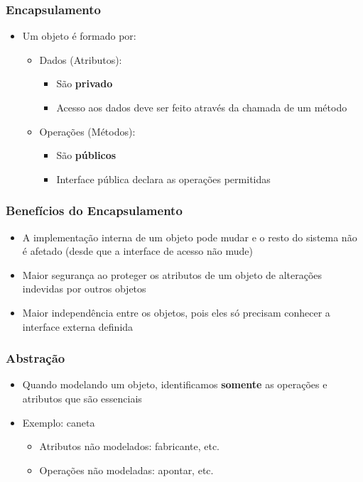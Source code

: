 \documentclass[aspectratio=169]{beamer}
\begin{document}
\begin{frame}\frametitle{Encapsulamento}
\begin{itemize}
	\item Um objeto é formado por:
	\begin{itemize}
		\item Dados (Atributos):
		\begin{itemize}
			\item São \textbf{privado}
			\item Acesso aos dados deve ser feito através da chamada de um método
		\end{itemize}
		\item Operações (Métodos):
		\begin{itemize}
			\item São \textbf{públicos}
			\item Interface pública declara as operações permitidas
		\end{itemize}
	\end{itemize}
\end{itemize}
\end{frame}

\begin{frame}\frametitle{Benefícios do Encapsulamento}
\begin{itemize}
	\item A implementação interna de um objeto pode mudar e o resto do sistema não é afetado (desde que a interface de acesso não mude)
	\item Maior segurança ao proteger os atributos de um objeto de alterações indevidas por outros objetos
	\item Maior independência entre os objetos, pois eles só precisam conhecer a interface externa definida
\end{itemize}
\end{frame}

\begin{frame}\frametitle{Abstração}
\begin{itemize}
	\item Quando modelando um objeto, identificamos \textbf{somente} as operações e atributos que são essenciais
	\item Exemplo: caneta
	\begin{itemize}
		\item Atributos não modelados: fabricante, etc.
		\item Operações não modeladas: apontar, etc.
	\end{itemize}
\end{itemize}
\end{frame}
\end{document}
